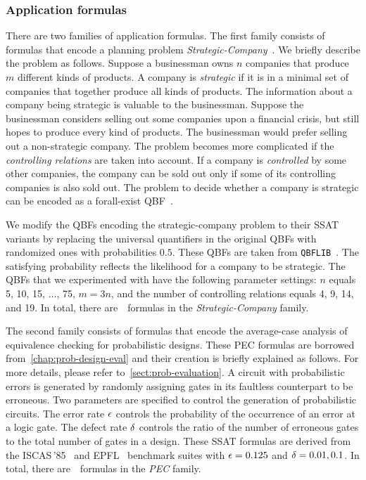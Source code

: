 \subsubsection{Application formulas}
There are two families of application formulas.
The first family consists of formulas that encode a planning problem
\textit{Strategic-Company}~\cite{Cadoli1997}.
We briefly describe the problem as follows.
Suppose a businessman owns $n$ companies that produce $m$ different kinds of products.
A company is \textit{strategic} if it is in a minimal set of companies that together produce all kinds of products.
The information about a company being strategic is valuable to the businessman.
Suppose the businessman considers selling out some companies upon a financial crisis,
but still hopes to produce every kind of products.
The businessman would prefer selling out a non-strategic company.
The problem becomes more complicated if the \textit{controlling relations} are taken into account.
If a company is \textit{controlled} by some other companies,
the company can be sold out only if some of its controlling companies is also sold out.
The problem to decide whether a company is strategic can be encoded as a forall-exist QBF~\cite{Faber2005,Leone2006}.

We modify the QBFs encoding the strategic-company problem
to their SSAT variants by replacing the universal quantifiers in the original QBFs
with randomized ones with probabilities $0.5$.
These QBFs are taken from \texttt{QBFLIB}~\cite{Narizzano2006}.
The satisfying probability reflects the likelihood for a company to be strategic.
The QBFs that we experimented with have the following parameter settings:
$n$ equals 5, 10, 15, $\ldots$, 75, $m=3n$,
and the number of controlling relations equals 4, 9, 14, and 19.
In total, there are~\nstrategic~formulas in the \textit{Strategic-Company} family.

The second family consists of formulas that encode
the average-case analysis of equivalence checking for probabilistic designs.
These PEC formulas are borrowed from~\cref{chap:prob-design-eval} and
their creation is briefly explained as follows.
For more details, please refer to~\cref{sect:prob-evaluation}.
A circuit with probabilistic errors is generated by
randomly assigning gates in its faultless counterpart to be erroneous.
Two parameters are specified to control the generation of probabilistic circuits.
The error rate $\epsilon$ controls the probability of the occurrence of an error at a logic gate.
The defect rate $\delta$ controls the ratio of the number of erroneous gates to the total number of gates in a design.
These SSAT formulas are derived from the ISCAS\,'85~\cite{ISCAS85-benchmark}
and EPFL~\cite{EPFL-benchmark} benchmark suites with $\epsilon=0.125$ and $\delta=0.01,0.1$.
In total, there are~\npec~formulas in the \textit{PEC} family.

